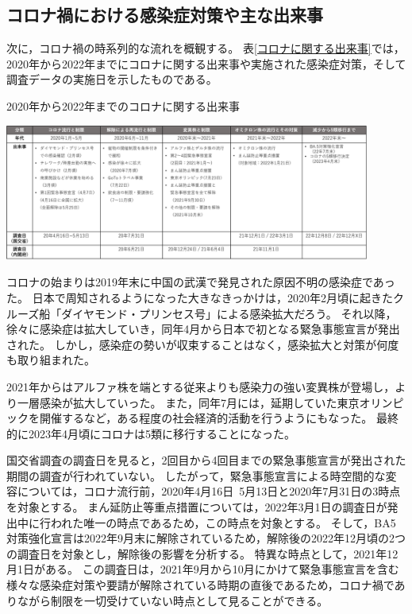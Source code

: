 \documentclass[paper={210mm,297mm},fontsize=15Q,line_length=35zw,number_of_lines=31,head_space=30mm,gutter=40mm,baselineskip=2.0zw,headfoot_verticalposition=1.5zw]{jlreq}
\begin{document}
\subsection{コロナ禍における感染症対策や主な出来事}

次に，コロナ禍の時系列的な流れを概観する。
表\ref{コロナに関する出来事}では，2020年から2022年までにコロナに関する出来事や実施された感染症対策，そして調査データの実施日を示したものである。

\begin{table}[H]
  \centering
  \caption{2020年から2022年までのコロナに関する出来事}
  \includegraphics[width=120mm]{../Figure/c03s02_fig_コロナに関する社会状況の整理.png}
  \label{コロナに関する出来事}
\end{table}

コロナの始まりは2019年末に中国の武漢で発見された原因不明の感染症であった。
日本で周知されるようになった大きなきっかけは，2020年2月頃に起きたクルーズ船「ダイヤモンド・プリンセス号」による感染拡大だろう。
それ以降，徐々に感染症は拡大していき，同年4月から日本で初となる緊急事態宣言が発出された。
しかし，感染症の勢いが収束することはなく，感染拡大と対策が何度も取り組まれた。

2021年からはアルファ株を端とする従来よりも感染力の強い変異株が登場し，より一層感染が拡大していった。
また，同年7月には，延期していた東京オリンピックを開催するなど，ある程度の社会経済的活動を行うようにもなった。
最終的に2023年4月頃にコロナは5類に移行することになった。

国交省調査の調査日を見ると，2回目から4回目までの緊急事態宣言が発出された期間の調査が行われていない。
したがって，緊急事態宣言による時空間的な変容については，コロナ流行前，2020年4月16日~5月13日と2020年7月31日の3時点を対象とする。
まん延防止等重点措置については，2022年3月1日の調査日が発出中に行われた唯一の時点であるため，この時点を対象とする。
そして，BA5対策強化宣言は2022年9月末に解除されているため，解除後の2022年12月頃の2つの調査日を対象とし，解除後の影響を分析する。
特異な時点として，2021年12月1日がある。
この調査日は，2021年9月から10月にかけて緊急事態宣言を含む様々な感染症対策や要請が解除されている時期の直後であるため，コロナ禍でありながら制限を一切受けていない時点として見ることができる。
\end{document}
